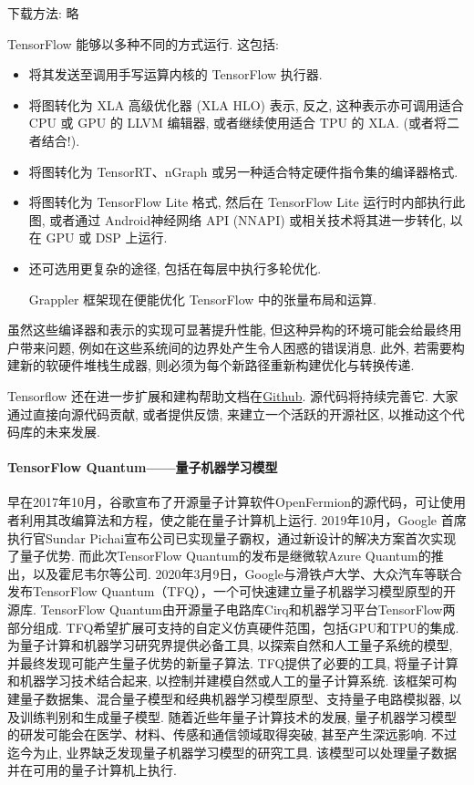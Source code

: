 \begin{itemize}
\begin{remark}
下载方法: 略
\end{remark}
TensorFlow 能够以多种不同的方式运行. 这包括:
\begin{itemize}
\item 将其发送至调用手写运算内核的 TensorFlow 执行器.
\item 将图转化为 XLA 高级优化器 (XLA HLO) 表示, 反之, 这种表示亦可调用适合 CPU 或 GPU 的 LLVM 编辑器, 或者继续使用适合 TPU 的 XLA. (或者将二者结合!).
\item 将图转化为 TensorRT、nGraph 或另一种适合特定硬件指令集的编译器格式.
\item 将图转化为 TensorFlow Lite 格式, 然后在 TensorFlow Lite 运行时内部执行此图, 或者通过 Android神经网络 API (NNAPI) 或相关技术将其进一步转化, 以在 GPU 或 DSP 上运行.
\item 还可选用更复杂的途径, 包括在每层中执行多轮优化.
\begin{example}
  Grappler 框架现在便能优化 TensorFlow 中的张量布局和运算.
\end{example}
\end{itemize}
虽然这些编译器和表示的实现可显著提升性能, 但这种异构的环境可能会给最终用户带来问题, 例如在这些系统间的边界处产生令人困惑的错误消息. 此外, 若需要构建新的软硬件堆栈生成器, 则必须为每个新路径重新构建优化与转换传递.

Tensorflow 还在进一步扩展和建构帮助文档在\href{https://github.com/tensorflow/docs}{Github}. 源代码将持续完善它. 大家通过直接向源代码贡献, 或者提供反馈, 来建立一个活跃的开源社区, 以推动这个代码库的未来发展.
\end{itemize}
\paragraph{TensorFlow Quantum——量子机器学习模型}
早在2017年10月，谷歌宣布了开源量子计算软件OpenFermion的源代码，可让使用者利用其改编算法和方程，使之能在量子计算机上运行.
2019年10月，Google 首席执行官Sundar Pichai宣布公司已实现量子霸权，通过新设计的解决方案首次实现了量子优势.
而此次TensorFlow Quantum的发布是继微软Azure Quantum的推出，以及霍尼韦尔等公司.
2020年3月9日，Google与滑铁卢大学、大众汽车等联合发布TensorFlow Quantum（TFQ），一个可快速建立量子机器学习模型原型的开源库.
TensorFlow Quantum由开源量子电路库Cirq和机器学习平台TensorFlow两部分组成.
TFQ希望扩展可支持的自定义仿真硬件范围，包括GPU和TPU的集成.
为量子计算和机器学习研究界提供必备工具, 以探索自然和人工量子系统的模型, 并最终发现可能产生量子优势的新量子算法.
TFQ提供了必要的工具, 将量子计算和机器学习技术结合起来, 以控制并建模自然或人工的量子计算系统. 该框架可构建量子数据集、混合量子模型和经典机器学习模型原型、支持量子电路模拟器, 以及训练判别和生成量子模型.
随着近些年量子计算技术的发展, 量子机器学习模型的研发可能会在医学、材料、传感和通信领域取得突破, 甚至产生深远影响. 不过迄今为止, 业界缺乏发现量子机器学习模型的研究工具. 该模型可以处理量子数据并在可用的量子计算机上执行.

